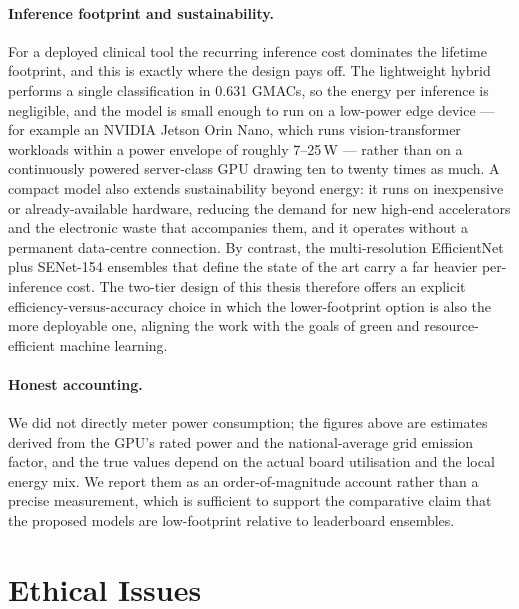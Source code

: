 \paragraph{Inference footprint and sustainability.}
For a deployed clinical tool the recurring inference cost dominates the
lifetime footprint, and this is exactly where the design pays off. The
lightweight hybrid performs a single classification in 0.631 GMACs, so the
energy per inference is negligible, and the model is small enough to run on a
low-power edge device --- for example an NVIDIA Jetson Orin Nano, which runs
vision-transformer workloads within a power envelope of roughly 7--25\,W ---
rather than on a continuously powered server-class GPU drawing ten to twenty
times as much. A compact model also extends sustainability beyond energy: it
runs on inexpensive or already-available hardware, reducing the demand for new
high-end accelerators and the electronic waste that accompanies them, and it
operates without a permanent data-centre connection. By contrast, the
multi-resolution EfficientNet plus SENet-154 ensembles that define the
state of the art carry a far heavier per-inference cost. The two-tier design
of this thesis therefore offers an explicit efficiency-versus-accuracy choice
in which the lower-footprint option is also the more deployable one, aligning
the work with the goals of green and resource-efficient machine learning.

\paragraph{Honest accounting.}
We did not directly meter power consumption; the figures above are estimates
derived from the GPU's rated power and the national-average grid emission
factor, and the true values depend on the actual board utilisation and the
local energy mix. We report them as an order-of-magnitude account rather than
a precise measurement, which is sufficient to support the comparative claim
that the proposed models are low-footprint relative to leaderboard ensembles.


\section{Ethical Issues}
\label{sec:ethics}

